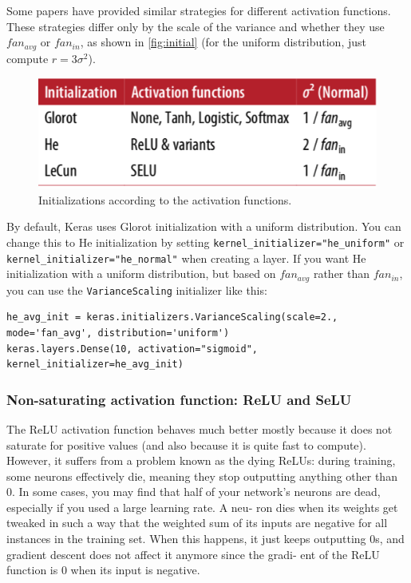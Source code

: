 Some papers have provided similar strategies for different activation functions. These strategies differ only by the scale of the variance and whether they use $fan_{avg}$ or $fan_{in}$, as shown in \autoref{fig:initial} (for the uniform distribution, just compute $r = 3\sigma^2$). 

\begin{figure}
\centering
\includegraphics[scale=0.4]{img/initialization}
\caption{Initializations according to the activation functions.}
\label{fig:initial}
\end{figure}
By default, Keras uses Glorot initialization with a uniform distribution. You can change this to He initialization by setting \lstinline+kernel_initializer="he_uniform"+ or \lstinline+kernel_initializer="he_normal"+ when creating a layer.
If you want He initialization with a uniform distribution, but based on $fan_{avg}$ rather
than $fan_{in}$, you can use the \lstinline+VarianceScaling+ initializer like this:
\begin{lstlisting}
he_avg_init = keras.initializers.VarianceScaling(scale=2., mode='fan_avg', distribution='uniform')
keras.layers.Dense(10, activation="sigmoid", kernel_initializer=he_avg_init)
\end{lstlisting}

\subsubsection{Non-saturating activation function: ReLU and SeLU}
The ReLU activation function behaves much better mostly because it does not saturate for positive values (and also because it is quite fast to compute). 
However, it suffers from a problem known as the dying ReLUs: during training, some neurons effectively die, meaning they stop outputting anything other than 0. In some cases, you may find that half of your network’s neurons are dead, especially if you used a large learning rate. A neu‐ ron dies when its weights get tweaked in such a way that the weighted sum of its inputs are negative for all instances in the training set. When this happens, it just keeps outputting 0s, and gradient descent does not affect it anymore since the gradi‐ ent of the ReLU function is 0 when its input is negative.

